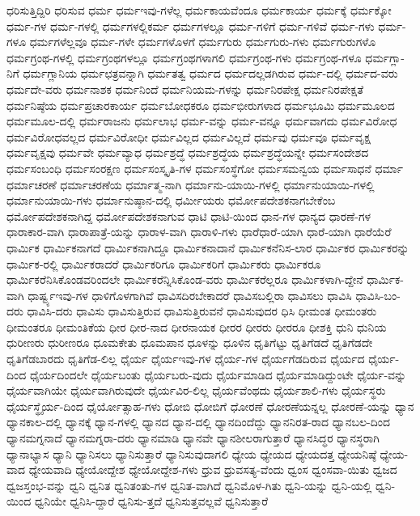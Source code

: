 {ಧರಿಸುತ್ತಿದ್ದಿರಿ
ಧರಿಸುವ
ಧರ್ಮ
ಧರ್ಮಇವು-ಗಳೆಲ್ಲ
ಧರ್ಮಕಾಯವೆಂದೂ
ಧರ್ಮಕಾರ್ಯ
ಧರ್ಮಕ್ಕೆ
ಧರ್ಮಕ್ಕೋ
ಧರ್ಮ-ಗಳ
ಧರ್ಮ-ಗಳಲ್ಲಿ
ಧರ್ಮಗಳಲ್ಲಿಕರ್ಮ
ಧರ್ಮಗಳಲ್ಲೂ
ಧರ್ಮ-ಗಳಿಗೆ
ಧರ್ಮ-ಗಳಿವೆ
ಧರ್ಮ-ಗಳು
ಧರ್ಮ-ಗಳೂ
ಧರ್ಮಗಳೆಲ್ಲವೂ
ಧರ್ಮ-ಗಳೇ
ಧರ್ಮಗಳೊಳಗೆ
ಧರ್ಮಗುರು
ಧರ್ಮಗುರು-ಗಳು
ಧರ್ಮಗುರುಗಳೊ
ಧರ್ಮಗ್ರಂಥ-ಗಳಲ್ಲಿ
ಧರ್ಮಗ್ರಂಥಗಳಲ್ಲೂ
ಧರ್ಮಗ್ರಂಥಗಳಾಗಲಿ
ಧರ್ಮಗ್ರಂಥ-ಗಳು
ಧರ್ಮಗ್ರಂಥ-ಗಳೂ
ಧರ್ಮಗ್ಲಾ-ನಿಗೆ
ಧರ್ಮಗ್ಲಾನಿಯ
ಧರ್ಮಛತ್ರವನ್ನಾಗಿ
ಧರ್ಮತತ್ವ
ಧರ್ಮದ
ಧರ್ಮದಲ್ಲಡಗಿರುವ
ಧರ್ಮ-ದಲ್ಲಿ
ಧರ್ಮದ-ವರು
ಧರ್ಮದೇ-ವರು
ಧರ್ಮನಾಶಕ
ಧರ್ಮನಿಂದೆ
ಧರ್ಮನಿಯಮ-ಗಳನ್ನು
ಧರ್ಮನಿರಪೇಕ್ಷ
ಧರ್ಮನಿರಪೇಕ್ಷತೆ
ಧರ್ಮನಿಷ್ಠೆಯ
ಧರ್ಮಪ್ರಚಾರಕಾರ್ಯ
ಧರ್ಮಬೋಧಕರೂ
ಧರ್ಮಭೀರುಗಳಾದ
ಧರ್ಮಭೂಮಿ
ಧರ್ಮಮೂಲದ
ಧರ್ಮಮೂಲ-ದಲ್ಲಿ
ಧರ್ಮರಾಜನು
ಧರ್ಮಲಾಭ
ಧರ್ಮ-ವನ್ನು
ಧರ್ಮ-ವನ್ನೂ
ಧರ್ಮವಾಗದು
ಧರ್ಮವಿರೋಧ
ಧರ್ಮವಿರೋಧವಲ್ಲದ
ಧರ್ಮವಿರೋಧೀ
ಧರ್ಮವಿಲ್ಲದ
ಧರ್ಮವಿಲ್ಲದೆ
ಧರ್ಮವು
ಧರ್ಮವೂ
ಧರ್ಮವೃಕ್ಷ
ಧರ್ಮವೃಕ್ಷವು
ಧರ್ಮವೇ
ಧರ್ಮವ್ಯಾಧ
ಧರ್ಮಶ್ರದ್ಧೆ
ಧರ್ಮಶ್ರದ್ಧೆಯ
ಧರ್ಮಶ್ರದ್ಧೆಯನ್ನೇ
ಧರ್ಮಸಂದೇಶದ
ಧರ್ಮಸಂಬಂಧಿ
ಧರ್ಮಸಂರಕ್ಷಣ
ಧರ್ಮಸಂಸ್ಕೃತಿ-ಗಳ
ಧರ್ಮಸಂಸ್ಥೆಗೋ
ಧರ್ಮಸಮನ್ವಯ
ಧರ್ಮಸಾಧನೆ
ಧರ್ಮಾ
ಧರ್ಮಾಚರಣೆ
ಧರ್ಮಾಚರಣೆಯ
ಧರ್ಮಾತ್ಮ-ನಾಗಿ
ಧರ್ಮಾನು-ಯಾಯಿ-ಗಳಲ್ಲಿ
ಧರ್ಮಾನುಯಾಯಿ-ಗಳಲ್ಲಿ
ಧರ್ಮಾನುಯಾಯಿ-ಗಳು
ಧರ್ಮಾನುಷ್ಠಾನ-ದಲ್ಲಿ
ಧರ್ಮೀಯರು
ಧರ್ಮೋಪದೇಶಕನಾಗಬೇಕೆಂಬ
ಧರ್ಮೋಪದೇಶಕನಾಗಿದ್ದ
ಧರ್ಮೋಪದೇಶಕನಾಗುವ
ಧಾಟಿ
ಧಾಟಿ-ಯಿಂದ
ಧಾನ-ಗಳ
ಧಾನ್ಯದ
ಧಾರಣೆ-ಗಳ
ಧಾರಾಕಾರ-ವಾಗಿ
ಧಾರಾಪಾತ್ರೆ-ಯನ್ನು
ಧಾರಾಳ-ವಾಗಿ
ಧಾರಾಳಿ-ಗಳು
ಧಾರೆಧಾರೆ-ಯಾಗಿ
ಧಾರೆ-ಯಾಗಿ
ಧಾರೆಯೆರೆ
ಧಾರ್ಮಿಕ
ಧಾರ್ಮಿಕನಾಗದೆ
ಧಾರ್ಮಿಕನಾಗಿದ್ದೂ
ಧಾರ್ಮಿಕನಾದಾನೆ
ಧಾರ್ಮಿಕನೆನಿಸ-ಲಾರ
ಧಾರ್ಮಿಕರ
ಧಾರ್ಮಿಕರನ್ನು
ಧಾರ್ಮಿಕ-ರಲ್ಲಿ
ಧಾರ್ಮಿಕರಾದರೆ
ಧಾರ್ಮಿಕರಿಗೂ
ಧಾರ್ಮಿಕರಿಗೆ
ಧಾರ್ಮಿಕರು
ಧಾರ್ಮಿಕರೂ
ಧಾರ್ಮಿಕರೆನಿಸಿಕೊಂಡವರಿಂದಲೇ
ಧಾರ್ಮಿಕರೆನ್ನಿಸಿಕೊಂಡ-ವರು
ಧಾರ್ಮಿಕರೆಲ್ಲರೂ
ಧಾರ್ಮಿಕಳಾಗಿ-ದ್ದೇನೆ
ಧಾರ್ಮಿಕ-ವಾಗಿ
ಧಾರ್ಷ್ಟ್ಯಇವು-ಗಳ
ಧಾಳಿಗೊಳಗಾಗಿವೆ
ಧಾವಿಸದಿರಬೇಕಾದರೆ
ಧಾವಿಸಬಲ್ಲಿರಾ
ಧಾವಿಸಲು
ಧಾವಿಸಿ
ಧಾವಿಸಿ-ಬಂ-ದರು
ಧಾವಿಸಿ-ದರು
ಧಾವಿಸು
ಧಾವಿಸುತ್ತಿರುವ
ಧಾವಿಸುತ್ತಿರುವನೆ
ಧಾವಿಸುವುದರ
ಧಿಸಿ
ಧೀಮಂತ
ಧೀಮಂತರು
ಧೀಮಂತರೂ
ಧೀಮಂತಿಕೆಯ
ಧೀರ
ಧೀರ-ನಾದ
ಧೀರನಾಯಕ
ಧೀರರ
ಧೀರರು
ಧೀರರೂ
ಧೀಶಕ್ತಿ
ಧುನಿ
ಧುನಿಯ
ಧುರೀಣರು
ಧುರೀಣರೂ
ಧೂಮಕೇತು
ಧೂಮಪಾನ
ಧೂಳನ್ನು
ಧೂಳಿನ
ಧೃತಿಗೆಟ್ಟು
ಧೃತಿಗೆಡದೆ
ಧೃತಿಗೆಡದೇ
ಧೃತಿಗೆಡಬಾರದು
ಧೃತಿಗೆಡ-ಲಿಲ್ಲ
ಧೈರ್ಯ
ಧೈರ್ಯಇವು-ಗಳ
ಧೈರ್ಯ-ಗಳ
ಧೈರ್ಯಗೆಡದಿರುವ
ಧೈರ್ಯದ
ಧೈರ್ಯ-ದಿಂದ
ಧೈರ್ಯದಿಂದಲೇ
ಧೈರ್ಯಬಂತು
ಧೈರ್ಯಬರು-ವುದು
ಧೈರ್ಯಮಾಡಿದ
ಧೈರ್ಯಮಾಡಿದ್ದುಂಟೇ
ಧೈರ್ಯ-ವನ್ನು
ಧೈರ್ಯವಾಗಿಯೇ
ಧೈರ್ಯವಾಗಿರುವುದೇ
ಧೈರ್ಯವಿರ-ಲಿಲ್ಲ
ಧೈರ್ಯವೆಂಥದು
ಧೈರ್ಯಶಾಲಿ-ಗಳು
ಧೈರ್ಯಸ್ಥರು
ಧೈರ್ಯಸ್ಥೈರ್ಯ-ದಿಂದ
ಧೈರ್ಯೋತ್ಸಾಹ-ಗಳು
ಧೋಬಿ
ಧೋಬಿಗೆ
ಧೋರಣೆ
ಧೋರಣೆಯನ್ನಲ್ಲ
ಧೋರಣೆ-ಯನ್ನು
ಧ್ಯಾನ
ಧ್ಯಾನಕಾಲ-ದಲ್ಲಿ
ಧ್ಯಾನಕ್ಕೆ
ಧ್ಯಾನ-ಗಳಲ್ಲಿ
ಧ್ಯಾನದ
ಧ್ಯಾನ-ದಲ್ಲಿ
ಧ್ಯಾನದಿಂದೆದ್ದು
ಧ್ಯಾನನಿರತ-ರಾದ
ಧ್ಯಾನಬಲ-ದಿಂದ
ಧ್ಯಾನಮಗ್ನನಾದೆ
ಧ್ಯಾನಮಗ್ನರಾ-ದರು
ಧ್ಯಾನಮಾಡಿ
ಧ್ಯಾನವೇ
ಧ್ಯಾನಶೀಲರಾಗುತ್ತಾರೆ
ಧ್ಯಾನಸಿದ್ಧರ
ಧ್ಯಾನಸ್ಥರಾಗಿ
ಧ್ಯಾನಾಭ್ಯಾಸ
ಧ್ಯಾನಿ
ಧ್ಯಾನಿಸಲು
ಧ್ಯಾನಿಸುತ್ತಾರೆ
ಧ್ಯಾನಿಸುವುದಾಗಲಿ
ಧ್ಯೇಯ
ಧ್ಯೇಯದ
ಧ್ಯೇಯದತ್ತ
ಧ್ಯೇಯನಿಷ್ಠೆ
ಧ್ಯೇಯ-ವಾದ
ಧ್ಯೇಯವಾದಿ
ಧ್ಯೇಯೋದ್ದೇಶ
ಧ್ಯೇಯೋದ್ದೇಶ-ಗಳು
ಧ್ರುವ
ಧ್ರುವಸತ್ಯ-ವೆಂದು
ಧ್ವಂಸ
ಧ್ವಂಸವಾ-ಯಿತು
ಧ್ವಜದ
ಧ್ವಜಸ್ತಂಭ-ವನ್ನು
ಧ್ವನಿ
ಧ್ವನಿತ
ಧ್ವನಿತಂತು-ಗಳ
ಧ್ವನಿತ-ವಾಗಿದೆ
ಧ್ವನಿಮೊಳ-ಗಿತು
ಧ್ವನಿ-ಯನ್ನು
ಧ್ವನಿ-ಯಲ್ಲಿ
ಧ್ವನಿ-ಯಿಂದ
ಧ್ವನಿಯೇ
ಧ್ವನಿಸಿ-ದ್ದಾರೆ
ಧ್ವನಿಸು-ತ್ತದೆ
ಧ್ವನಿಸುತ್ತವಲ್ಲವೆ
ಧ್ವನಿಸುತ್ತಾರೆ
}
